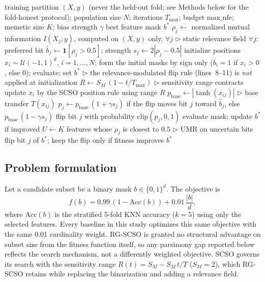 \documentclass[preprint,3p,times]{elsarticle}
\begin{document}
\begin{algorithm}[!t]
\caption{RG-SCSO for binary feature selection}
\label{alg:main}
\begin{algorithmic}[1]
  \REQUIRE training partition $(X,y)$ (never the held-out fold; see Methods
    below for the fold-honest protocol); population size $N$; iterations
    $T_{\max}$; budget $\mathrm{max\_nfe}$; memetic size $K$; bias
    strength $\gamma$
  \ENSURE best feature mask $b^\ast$
  \STATE $\rho_j \leftarrow$ normalized mutual information $I(X_j;y)$,
    computed on $(X,y)$ only, $\forall j$ \hfill$\triangleright$ static
    relevance field
  \STATE $\forall j$: preferred bit $\hat{b}_j \leftarrow \mathbf{1}[\rho_j>0.5]$;
    strength $s_j \leftarrow 2|\rho_j-0.5|$
  \STATE initialize positions $x_i \sim \mathcal{U}(-1,1)^d$, $i=1,\dots,N$;
    form the initial masks by sign only ($b_i=1$ if $x_i>0$, else $0$);
    evaluate; set $b^\ast$ \hfill$\triangleright$ the relevance-modulated flip
    rule (lines~8--11) is \emph{not} applied at initialization
    \STATE $R \leftarrow S_M\,(1-t/T_{\max})$ \hfill$\triangleright$ sensitivity range contracts
      \STATE update $x_i$ by the SCSO position rule using range $R$
        \STATE $p_{\text{base}} \leftarrow |\tanh(x_{ij})|$ \hfill$\triangleright$ base transfer $T(x_{ij})$
        \STATE $p_j \leftarrow p_{\text{base}}\,(1+\gamma s_j)$ if the flip moves bit $j$ toward
          $\hat{b}_j$, else $p_{\text{base}}\,(1-\gamma s_j)$
        \STATE flip bit $j$ with probability $\mathrm{clip}(p_j,0,1)$
      \ENDFOR
      \STATE evaluate mask; update $b^\ast$ if improved
    \ENDFOR
    \STATE $U \leftarrow K$ features whose $\rho_j$ is closest to $0.5$
      \hfill$\triangleright$ UMR on uncertain bits
      \STATE flip bit $j$ of $b^\ast$; keep the flip only if fitness improves
    \ENDFOR
  \ENDWHILE
  \RETURN $b^\ast$
\end{algorithmic}
\end{algorithm}

\subsection{Problem formulation}
Let a candidate subset be a binary mask $b\in\{0,1\}^d$. The objective is
\begin{equation}
  f(b) = 0.99\,(1-\mathrm{Acc}(b)) + 0.01\,\frac{|b|}{d},
  \label{eq:fitness}
\end{equation}
where $\mathrm{Acc}(b)$ is the stratified 5-fold KNN accuracy ($k=5$) using only
the selected features. Every baseline in this study optimizes this same
objective with the same 0.01 cardinality weight. RG-SCSO is granted no
structural advantage on subset size from the fitness function itself, so any
parsimony gap reported below reflects the search mechanism, not a differently
weighted objective. SCSO governs its search with the sensitivity range
$R(t)=S_M - S_M\,t/T$ ($S_M=2$), which RG-SCSO retains while replacing the
binarization and adding a relevance field.
\end{document}
